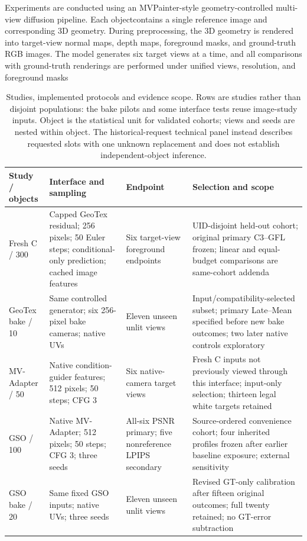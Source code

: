 \documentclass[times,twocolumn,final]{elsarticle}
\providecommand{\DIFdel}[1]{{\protect\color{red} \scriptsize #1}} %
\providecommand{\DIFaddbegin}{} %
\providecommand{\DIFdelbegin}{} %
\providecommand{\DIFdelend}{} %
\begin{document}
\DIFdelbegin \DIFdel{Experiments are conducted using an MVPainter-style geometry-controlled multi-view diffusion pipeline. Each objectcontains a single reference image and corresponding 3D geometry. During preprocessing, the 3D geometry is rendered into target-view normal maps, depth maps, foreground masks, and ground-truth RGB images. The model generates six target views at a time, and all comparisons with ground-truth renderings are performed under unified views, resolution, and foreground masks}\DIFdelend \DIFaddbegin \begin{table}[t]
\centering\scriptsize\setlength{\tabcolsep}{3pt}
\caption{Studies, implemented protocols and evidence scope. Rows are studies rather than disjoint populations: the bake pilots and some interface tests reuse image-study inputs. Object is the statistical unit for validated cohorts; views and seeds are nested within object. The historical-request technical panel instead describes requested slots with one unknown replacement and does not establish independent-object inference.}
\label{tab:study-design}
\begin{tabular}{p{}p{}p{}p{}}
\toprule Study / objects & Interface and sampling & Endpoint & Selection and scope \\
\midrule
Fresh C / 300 & Capped GeoTex residual; 256 pixels; 50 Euler steps; conditional-only prediction; cached image features & Six target-view foreground endpoints & UID-disjoint held-out cohort; original primary C3--GFL frozen; linear and equal-budget comparisons are same-cohort addenda \\
GeoTex bake / 10 & Same controlled generator; six 256-pixel bake cameras; native UVs & Eleven unseen unlit views & Input/compatibility-selected subset; primary Late--Mean specified before new bake outcomes; two later native controls exploratory \\
MV-Adapter / 50 & Native condition-guider features; 512 pixels; 50 steps; CFG 3 & Six native-camera target views & Fresh C inputs not previously viewed through this interface; input-only selection; thirteen legal white targets retained \\
GSO / 100 & Native MV-Adapter; 512 pixels; 50 steps; CFG 3; three seeds & All-six PSNR primary; five nonreference LPIPS secondary & Source-ordered convenience cohort; four inherited profiles frozen after earlier baseline exposure; external sensitivity \\
GSO bake / 20 & Same fixed GSO inputs; native UVs; three seeds & Eleven unseen unlit views & Revised GT-only calibration after fifteen original outcomes; full twenty retained; no GT-error subtraction \\

\end{tabular}
\end{table}
\end{document}
